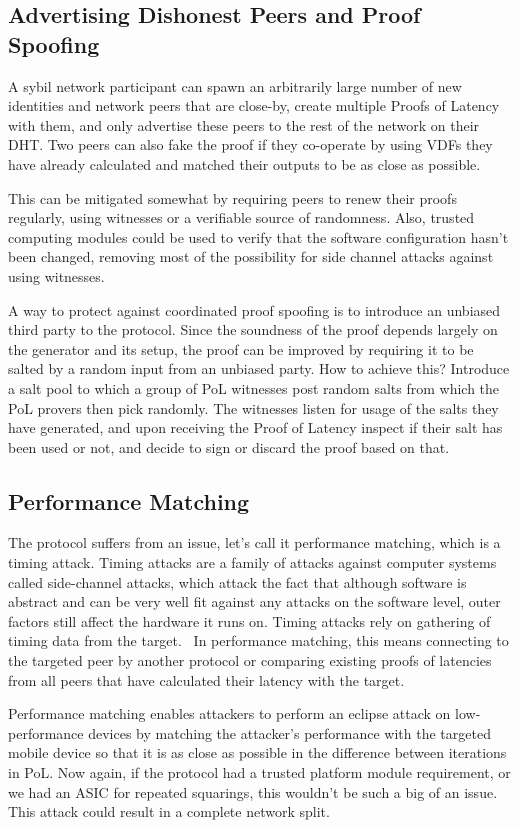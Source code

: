 \subsection{Advertising Dishonest Peers and Proof Spoofing}
A sybil network participant can spawn an arbitrarily large number of new identities and network peers that are close-by, create multiple Proofs of Latency with them, and only advertise these peers to the rest of the network on their DHT. Two peers can also fake the proof if they co-operate by using VDFs they have already calculated and matched their outputs to be as close as possible.

This can be mitigated somewhat by requiring peers to renew their proofs regularly, using witnesses or a verifiable source of randomness. Also, trusted computing modules could be used to verify that the software configuration hasn't been changed, removing most of the possibility for side channel attacks against using witnesses.

A way to protect against coordinated proof spoofing is to introduce an unbiased third party to the protocol. Since the soundness of the proof depends largely on the generator and its setup, the proof can be improved by requiring it to be salted by a random input from an unbiased party. How to achieve this? Introduce a salt pool to which a group of PoL witnesses post random salts from which the PoL provers then pick randomly. The witnesses listen for usage of the salts they have generated, and upon receiving the Proof of Latency inspect if their salt has been used or not, and decide to sign or discard the proof based on that.

\subsection{Performance Matching}
The protocol suffers from an issue, let's call it performance matching, which is a timing attack. Timing attacks are a family of attacks against computer systems called side-channel attacks, which attack the fact that although software is abstract and can be very well fit against any attacks on the software level, outer factors still affect the hardware it runs on. Timing attacks rely on gathering of timing data from the target.~\cite{noauthor_undated-mp} In performance matching, this means connecting to the targeted peer by another protocol or comparing existing proofs of latencies from all peers that have calculated their latency with the target.

Performance matching enables attackers to perform an eclipse attack on low-performance devices by matching the attacker's performance with the targeted mobile device so that it is as close as possible in the difference between iterations in PoL. Now again, if the protocol had a trusted platform module requirement, or we had an ASIC for repeated squarings, this wouldn't be such a big of an issue. This attack could result in a complete network split.

